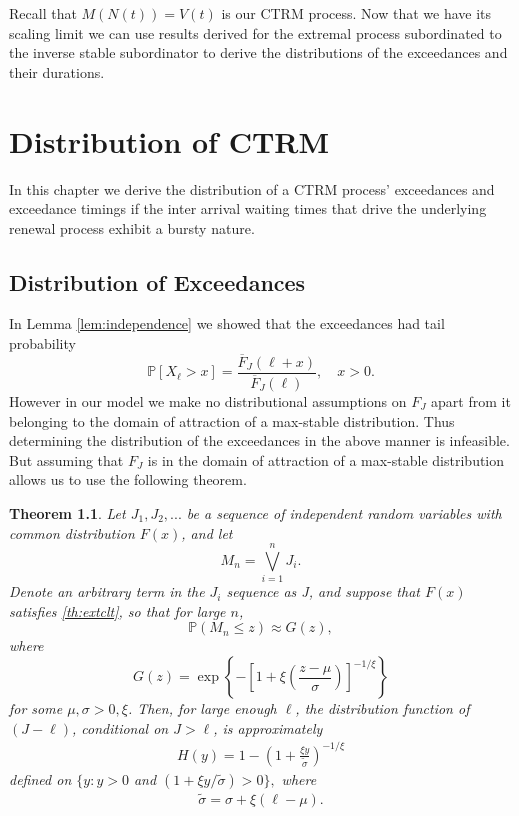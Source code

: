 \documentclass[honours,12pt]{unswthesis}
\newcommand{\PP}{\mathbb{P}}
\newcommand{\1}{\mathbf 1}
\newtheorem{theorem}[equation]{Theorem}
\numberwithin{equation}{section}
\theoremstyle{definition}
\theoremstyle{remark}
\begin{document}
\noindent Recall that $M(N(t))=V(t)$ is our CTRM process. Now that we have its scaling limit we can use results derived for the extremal process subordinated to the inverse stable subordinator to derive the distributions of the exceedances and their durations.
\chapter{Distribution of CTRM}\label{distributions}
In this chapter we derive the distribution of a CTRM process' exceedances and exceedance timings if the inter arrival waiting times that drive the underlying renewal process exhibit a bursty nature.
\section{Distribution of Exceedances}
In Lemma \ref{lem:independence} we showed that the exceedances had tail probability
\[
\PP[X_\ell > x]= \frac{\overline F_J(\ell + x)}{\overline F_J(\ell)}, \quad x > 0.
\] 
However in our model we make no distributional assumptions on $F_J$ apart from it belonging to the domain of attraction of a max-stable distribution. Thus determining the distribution of the exceedances in the above manner is infeasible. But assuming that $F_J$ is in the domain of attraction of a max-stable distribution allows us to use the following theorem.
\begin{theorem}\cite{ColesBook}\label{th:GP}
Let $J_1,J_2,...$ be a sequence of independent random variables with common distribution $F(x)$, and let
\[
	M_n=\bigvee_{i=1}^n J_i.
\]
Denote an arbitrary term in the $J_i$ sequence as J, and suppose that $F(x)$ satisfies \ref{th:extclt}, so that for large $n$,
\[
	\PP(M_n\leq z)\approx G(z),
\]
where
\[
	G(z)=\exp\left\{-\left[1+\xi\left(\frac{z-\mu}{\sigma}\right)\right]^{-1/\xi}\right\}
\]
for some $\mu,\sigma>0,\xi$. Then, for large enough $\ell$, the distribution function of $(J-\ell)$, conditional on $J>\ell$, is approximately
\begin{align}\label{eq:GPfamily}
	H(y)=1-\left(1+\frac{\xi y}{\tilde \sigma}\right)^{-1/\xi}
\end{align}
defined on $\{y:y>0$ and $(1+\xi y/\tilde \sigma)>0 \},$ where
\begin{align*}
	\tilde \sigma =\sigma + \xi(\ell-\mu).
\end{align*}
\end{theorem}
\end{document}
